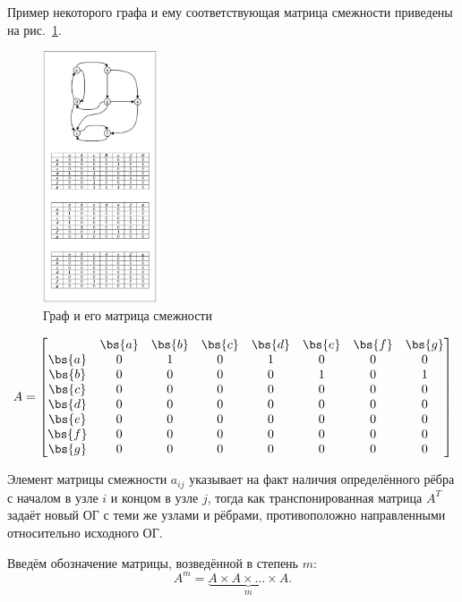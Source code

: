 Пример некоторого графа и ему соответствующая матрица смежности приведены на рис.~\ref{fig.rndhpcedt.2021.11.14.01}.

\begin{figure}[!ht]
	\centering
	\includegraphics[width=0.3\textwidth]{ResearchNotes/rndhpc_not_edt_2021_11_14/adj_matrix.png}
	\caption{Граф и его матрица смежности}\label{fig.rndhpcedt.2021.11.14.01}
\end{figure}


\begin{equation}\label{eq.rndhpcedt.2021.11.14.00}
A=%
\begin{bmatrix}
	&	\bs{a}	&	\bs{b}	&	\bs{c}	&	\bs{d}	&	\bs{e}	&	\bs{f}	&	\bs{g} \\
\bs{a}	&	0	&	1	&	0	& 1	& 0	& 0 & 0 \\
\bs{b}	&	0	&	0	&	0	& 0	& 1	& 0 & 1 \\
\bs{c}	&	0	&	0	&	0	& 0	& 0	& 0 & 0 \\
\bs{d}	&	0	&	0	&	0	& 0	& 0	& 0 & 0 \\
\bs{e}	&	0	&	0	&	0	& 0	& 0	& 0 & 0 \\
\bs{f}	&	0	&	0	&	0	& 0	& 0	& 0 & 0 \\
\bs{g}	&	0	&	0	&	0	& 0	& 0	& 0 & 0 \\
\end{bmatrix}
\end{equation}

Элемент матрицы смежности $a_{ij}$ указывает на факт наличия определённого рёбра с началом в узле $i$ и концом в узле $j$, тогда как транспонированная матрица $A^T$ задаёт новый ОГ с теми же узлами и рёбрами, противоположно направленными относительно исходного ОГ.


Введём обозначение матрицы, возведённой в степень $m$:
\begin{equation}\label{eq.rndhpcedt.2021.11.14.02}
A^m=\underbrace{A\times A \times \ldots \times A}_{m}.
\end{equation}

